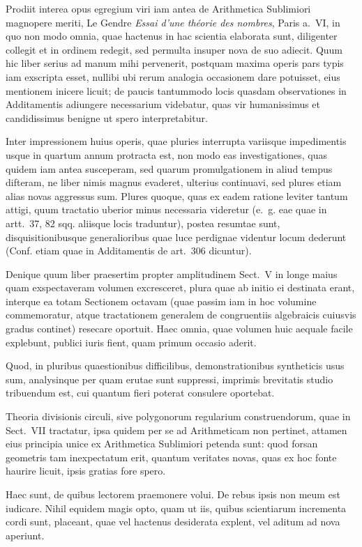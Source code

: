 \documentclass[12pt,a4paper]{article}
\theoremstyle{plain}
\theoremstyle{definition}
\theoremstyle{remark}
\begin{document}
Prodiit interea opus egregium viri iam antea de Arithmetica Sublimiori magnopere meriti, Le Gendre \emph{Essai d'une th\'eorie des nombres}, Paris a.~VI, in quo non modo omnia, quae hactenus in hac scientia elaborata sunt, diligenter collegit et in ordinem redegit, sed permulta insuper nova de suo adiecit. Quum hic liber serius ad manum mihi pervenerit, postquam maxima operis pars typis iam exscripta esset, nullibi ubi rerum analogia occasionem dare potuisset, eius mentionem inicere licuit; de paucis tantummodo locis quasdam observationes in Additamentis adiungere necessarium videbatur, quas vir humanissimus et candidissimus benigne ut spero interpretabitur.

Inter impressionem huius operis, quae pluries interrupta variisque impedimentis usque in quartum annum protracta est, non modo eas investigationes, quas quidem iam antea susceperam, sed quarum promulgationem in aliud tempus difteram, ne liber nimis magnus evaderet, ulterius continuavi, sed plures etiam alias novas aggressus sum. Plures quoque, quas ex eadem ratione leviter tantum attigi, quum tractatio uberior minus necessaria videretur (e.~g. eae quae in artt.~37, 82 sqq. aliisque locis traduntur), postea resumtae sunt, disquisitionibusque generalioribus quae luce perdignae videntur locum dederunt (Conf. etiam quae in Additamentis de art.~306 dicuntur).

Denique quum liber praesertim propter amplitudinem Sect.~V in longe maius quam exspectaveram volumen excresceret, plura quae ab initio ei destinata erant, interque ea totam Sectionem octavam (quae passim iam in hoc volumine commemoratur, atque tractationem generalem de congruentiis algebraicis cuiusvis gradus continet) resecare oportuit. Haec omnia, quae volumen huic aequale facile explebunt, publici iuris fient, quam primum occasio aderit.

Quod, in pluribus quaestionibus difficilibus, demonstrationibus syntheticis usus sum, analysinque per quam erutae sunt suppressi, imprimis brevitatis studio tribuendum est, cui quantum fieri poterat consulere oportebat.

Theoria divisionis circuli, sive polygonorum regularium construendorum, quae in Sect.~VII tractatur, ipsa quidem per se ad Arithmeticam non pertinet, attamen eius principia unice ex Arithmetica Sublimiori petenda sunt: quod forsan geometris tam inexpectatum erit, quantum veritates novas, quas ex hoc fonte haurire licuit, ipsis gratias fore spero.

Haec sunt, de quibus lectorem praemonere volui. De rebus ipsis non meum est iudicare. Nihil equidem magis opto, quam ut iis, quibus scientiarum incrementa cordi sunt, placeant, quae vel hactenus desiderata explent, vel aditum ad nova aperiunt.
\end{document}
